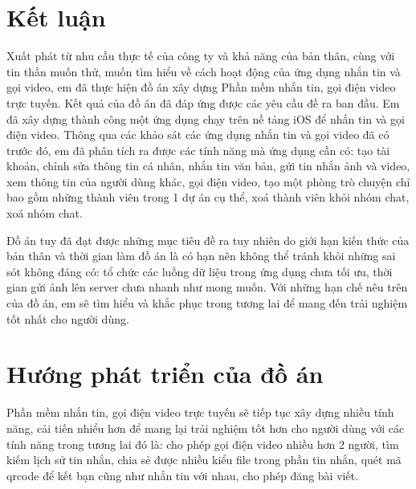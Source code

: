 \documentclass[../DoAn.tex]{subfiles}
\begin{document}
\section{Kết luận}
Xuất phát từ nhu cầu thực tế của công ty và khả năng của bản thân, cùng với tin thần muốn thử, muốn tìm hiểu về cách hoạt động của ứng dụng nhắn tin và gọi video, em đã thực hiện đồ án xây dựng Phần mềm nhắn tin, gọi điện video trực tuyến. 
Kết quả của đồ án đã đáp ứng được các yêu cầu đề ra ban đầu. Em đã xây dựng thành công một ứng dụng chạy trên nề tảng iOS để nhắn tin và gọi điện video. Thông qua các khảo sát các ứng dụng nhắn tin và gọi video đã có trước đó, em đã phân tích ra được các tính năng mà ứng dụng cần có: tạo tài khoản, chỉnh sửa thông tin cá nhân, nhắn tin văn bản, gửi tin nhắn ảnh và video, xem thông tin của người dùng khác, gọi điện video, tạo một phòng trò chuyện chỉ bao gồm những thành viên trong 1 dự án cụ thể, xoá thành viên khỏi nhóm chat, xoá nhóm chat.

Đồ án tuy đã đạt được những mục tiêu đề ra tuy nhiên do giới hạn kiến thức của bản thân và thời gian làm đồ án là có hạn nên không thể tránh khỏi những sai sót không đáng có: tổ chức các luồng dữ liệu trong ứng dụng chưa tối ưu, thời gian gửi ảnh lên server chưa nhanh như mong muốn. Với những hạn chế nêu trên của đồ án, em sẽ tìm hiểu và khắc phục trong tương lai để mang đến trải nghiệm tốt nhất cho người dùng.

\section{Hướng phát triển của đồ án}
Phần mềm nhắn tin, gọi điện video trực tuyến sẽ tiếp tục xây dựng nhiều tính năng, cải tiến nhiểu hơn để mang lại trải nghiệm tốt hơn cho người dùng với các tính năng trong tương lai đó là: cho phép gọi điện video nhiều hơn 2 người, tìm kiếm lịch sử tin nhắn, chia sẻ được nhiều kiểu file trong phần tin nhắn, quét mã qrcode để kết bạn cũng như nhắn tin với nhau, cho phép đăng bài viết.
\end{document}
